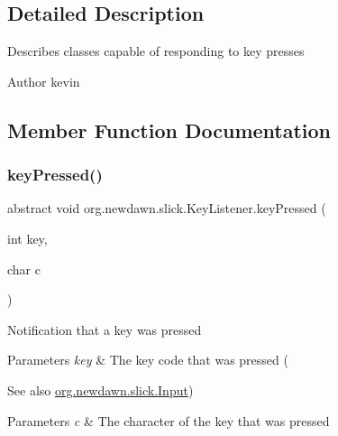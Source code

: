 \subsection{Detailed Description}
Describes classes capable of responding to key presses

\begin{DoxyAuthor}{Author}
kevin 
\end{DoxyAuthor}


\subsection{Member Function Documentation}
\mbox{\label{interfaceorg_1_1newdawn_1_1slick_1_1_key_listener_ac0b0568a21ef486c4f51382614c196ef}} 
\subsubsection{\texorpdfstring{key\+Pressed()}{keyPressed()}}
{\footnotesize\ttfamily abstract void org.\+newdawn.\+slick.\+Key\+Listener.\+key\+Pressed (\begin{DoxyParamCaption}\item[{int}]{key,  }\item[{char}]{c }\end{DoxyParamCaption})\hspace{0.3cm}{\ttfamily [abstract]}}

Notification that a key was pressed


\begin{DoxyParams}{Parameters}
{\em key} & The key code that was pressed (\\
\hline
\end{DoxyParams}
\begin{DoxySeeAlso}{See also}
\mbox{\hyperlink{classorg_1_1newdawn_1_1slick_1_1_input}{org.\+newdawn.\+slick.\+Input}}) 
\end{DoxySeeAlso}

\begin{DoxyParams}{Parameters}
{\em c} & The character of the key that was pressed \\
\hline
\end{DoxyParams}


